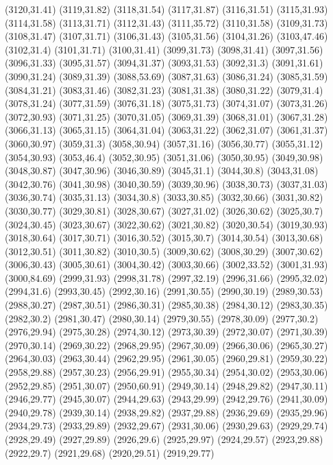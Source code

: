 (3120,31.41)
(3119,31.82)
(3118,31.54)
(3117,31.87)
(3116,31.51)
(3115,31.93)
(3114,31.58)
(3113,31.71)
(3112,31.43)
(3111,35.72)
(3110,31.58)
(3109,31.73)
(3108,31.47)
(3107,31.71)
(3106,31.43)
(3105,31.56)
(3104,31.26)
(3103,47.46)
(3102,31.4)
(3101,31.71)
(3100,31.41)
(3099,31.73)
(3098,31.41)
(3097,31.56)
(3096,31.33)
(3095,31.57)
(3094,31.37)
(3093,31.53)
(3092,31.3)
(3091,31.61)
(3090,31.24)
(3089,31.39)
(3088,53.69)
(3087,31.63)
(3086,31.24)
(3085,31.59)
(3084,31.21)
(3083,31.46)
(3082,31.23)
(3081,31.38)
(3080,31.22)
(3079,31.4)
(3078,31.24)
(3077,31.59)
(3076,31.18)
(3075,31.73)
(3074,31.07)
(3073,31.26)
(3072,30.93)
(3071,31.25)
(3070,31.05)
(3069,31.39)
(3068,31.01)
(3067,31.28)
(3066,31.13)
(3065,31.15)
(3064,31.04)
(3063,31.22)
(3062,31.07)
(3061,31.37)
(3060,30.97)
(3059,31.3)
(3058,30.94)
(3057,31.16)
(3056,30.77)
(3055,31.12)
(3054,30.93)
(3053,46.4)
(3052,30.95)
(3051,31.06)
(3050,30.95)
(3049,30.98)
(3048,30.87)
(3047,30.96)
(3046,30.89)
(3045,31.1)
(3044,30.8)
(3043,31.08)
(3042,30.76)
(3041,30.98)
(3040,30.59)
(3039,30.96)
(3038,30.73)
(3037,31.03)
(3036,30.74)
(3035,31.13)
(3034,30.8)
(3033,30.85)
(3032,30.66)
(3031,30.82)
(3030,30.77)
(3029,30.81)
(3028,30.67)
(3027,31.02)
(3026,30.62)
(3025,30.7)
(3024,30.45)
(3023,30.67)
(3022,30.62)
(3021,30.82)
(3020,30.54)
(3019,30.93)
(3018,30.64)
(3017,30.71)
(3016,30.52)
(3015,30.7)
(3014,30.54)
(3013,30.68)
(3012,30.51)
(3011,30.82)
(3010,30.5)
(3009,30.62)
(3008,30.29)
(3007,30.62)
(3006,30.43)
(3005,30.61)
(3004,30.42)
(3003,30.66)
(3002,33.52)
(3001,31.93)
(3000,84.69)
(2999,31.93)
(2998,31.78)
(2997,32.19)
(2996,31.66)
(2995,32.02)
(2994,31.6)
(2993,30.45)
(2992,30.16)
(2991,30.55)
(2990,30.19)
(2989,30.53)
(2988,30.27)
(2987,30.51)
(2986,30.31)
(2985,30.38)
(2984,30.12)
(2983,30.35)
(2982,30.2)
(2981,30.47)
(2980,30.14)
(2979,30.55)
(2978,30.09)
(2977,30.2)
(2976,29.94)
(2975,30.28)
(2974,30.12)
(2973,30.39)
(2972,30.07)
(2971,30.39)
(2970,30.14)
(2969,30.22)
(2968,29.95)
(2967,30.09)
(2966,30.06)
(2965,30.27)
(2964,30.03)
(2963,30.44)
(2962,29.95)
(2961,30.05)
(2960,29.81)
(2959,30.22)
(2958,29.88)
(2957,30.23)
(2956,29.91)
(2955,30.34)
(2954,30.02)
(2953,30.06)
(2952,29.85)
(2951,30.07)
(2950,60.91)
(2949,30.14)
(2948,29.82)
(2947,30.11)
(2946,29.77)
(2945,30.07)
(2944,29.63)
(2943,29.99)
(2942,29.76)
(2941,30.09)
(2940,29.78)
(2939,30.14)
(2938,29.82)
(2937,29.88)
(2936,29.69)
(2935,29.96)
(2934,29.73)
(2933,29.89)
(2932,29.67)
(2931,30.06)
(2930,29.63)
(2929,29.74)
(2928,29.49)
(2927,29.89)
(2926,29.6)
(2925,29.97)
(2924,29.57)
(2923,29.88)
(2922,29.7)
(2921,29.68)
(2920,29.51)
(2919,29.77)
